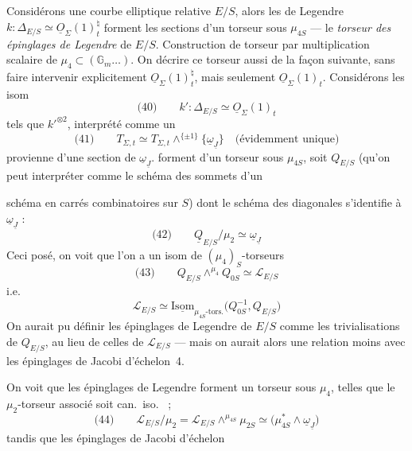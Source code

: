 \documentclass[11pt,a4paper]{article}
\begin{document}
Considérons une courbe elliptique relative $E/S$, alors les
  de Legendre
$k : \Delta_{E/S} \simeq \underline{O}_{\Sigma}(1)_t^{\natural}$ forment les
sections d'un torseur  sous $\mu_{4S}$ --- le
\emph{torseur des épinglages de Legendre} de $E/S$. Construction de
torseur par multiplication scalaire de $\mu_4 \subset (\mathbb{G}_m \ldots)$.
On   décrire ce torseur aussi de la façon
suivante, sans faire intervenir explicitement
$\underline{O}_{\Sigma}(1)_t^{\natural}$, mais seulement
$\underline{O}_{\Sigma}(1)_t$. Considérons les isom
\[
  \text{(40)} \qquad k' : \Delta_{E/S} \simeq \underline{O}_{\Sigma}(1)_t
\]
tels que $k'^{\otimes 2}$, interprété comme un
\[
  \text{(41)} \qquad T_{\Sigma,t} \simeq T_{\Sigma,t} \wedge^{\{\pm 1\}}
  \{\underline{\omega}_{\underline{J}}\}
  \quad \text{(évidemment unique)}
\]
 provienne d'une section de $\underline{\omega}_{\underline{J}}$.
 forment   d'un torseur
sous $\mu_{4S}$, soit $Q_{E/S}$ (qu'on peut interpréter comme le schéma des
sommets d'un

schéma en carrés combinatoires sur $S$) dont le schéma des diagonales
s'identifie à $\underline{\omega}_{\underline{J}}$ :
\[
  \text{(42)} \qquad \underline{Q}_{E/S}/\mu_2 \simeq \underline{\omega}_{\underline{J}}
\]
Ceci posé, on voit que l'on a un isom  de $(\mu_4)_S$-torseurs
\[
  \text{(43)} \qquad Q_{E/S} \wedge^{\mu_4} Q_{0S} \simeq \mathcal{L}_{E/S}
\]
i.e.
\[
  \mathcal{L}_{E/S} \simeq \underline{\mathrm{Isom}}_{\mu_{4S}\text{-tors.}}
  \bigl(Q_{0S}^{-1}, Q_{E/S}\bigr)
\]
On aurait pu définir les épinglages de Legendre de $E/S$ comme les
trivialisations de $Q_{E/S}$, au lieu de celles de $\mathcal{L}_{E/S}$ ---
mais on aurait alors une relation moins  avec les épinglages de Jacobi
d'échelon~4.

On voit  que les épinglages  de Legendre forment
 un torseur sous $\mu_4$, telles que le $\mu_2$-torseur
associé soit can.\ iso.\  ;
\[
  \text{(44)} \qquad \mathcal{L}_{E/S}/\mu_2 = \mathcal{L}_{E/S}
  \wedge^{\mu_{4S}} \mu_{2S} \simeq
  \bigl(\mu_{4S}^{*} \wedge \underline{\omega}_{\underline{J}}\bigr)
\]
tandis que les épinglages de Jacobi d'échelon
\end{document}
